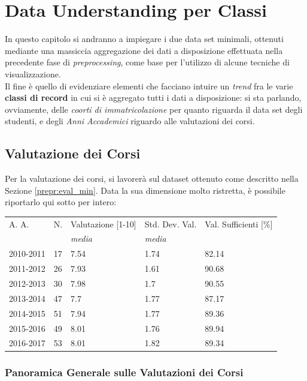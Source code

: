 \chapter{Data Understanding per Classi}
\label{ch:visual}

In questo capitolo si andranno a impiegare i due data set minimali, ottenuti mediante una massiccia aggregazione dei dati a disposizione effettuata nella precedente fase di \textit{preprocessing}, come base per l'utilizzo di alcune tecniche di visualizzazione. \\

Il fine è quello di evidenziare elementi che facciano intuire un \textit{trend} fra le varie \textbf{classi di record} in cui si è aggregato tutti i dati a disposizione: si sta parlando, ovviamente, delle \textit{coorti di immatricolazione} per quanto riguarda il data set degli studenti, e degli \textit{Anni Accademici} riguardo alle valutazioni dei corsi.

\section{Valutazione dei Corsi}

Per la valutazione dei corsi, si lavorerà sul dataset ottenuto come descritto nella Sezione \ref{prepr:eval_min}. Data la sua dimensione molto ristretta, è possibile riportarlo qui sotto per intero:

\noindent\begin{table}[]
\begin{tabular}{lllll}
\hline
A. A. & N. & Valutazione [1-10] & Std. Dev. Val. & Val. Sufficienti {[}\%{]} \\
& & \textit{media} & \textit{media} & \\
\hline
2010-2011 &  17 & 7.54 & 1.74 & 82.14 \\
2011-2012 &  26 & 7.93 & 1.61 & 90.68 \\
2012-2013 & 30  & 7.98 & 1.7 & 90.55 \\
2013-2014 & 47  & 7.7 & 1.77 & 87.17 \\
2014-2015 &  51 & 7.94 & 1.77 & 89.36 \\
2015-2016 &  49 & 8.01 & 1.76 & 89.94 \\
2016-2017 &  53 & 8.01 & 1.82 & 89.34 \\ \hline
\end{tabular}
\end{table}

    \subsection{Panoramica Generale sulle Valutazioni dei Corsi}
    \label{visual:eval_gen}

